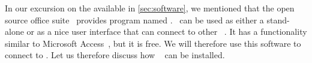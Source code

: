 %
%
\label{sec:installLibreOffice}%
%
In our excursion on the available  in \cref{sec:software}, we mentioned that the open source office suite \libreoffice\ provides program named \libreofficeBase.
\libreofficeBase\ can be used as either a stand-alone  or as a nice user interface that can connect to other ~\cite{FNFHWSKLSSGLFRSRPLJG2022BG7R1BOL7C,S2022L7PFEUU}.
It has a functionality similar to Microsoft Access~\cite{SSI2023MA2BTA,B2020HOMA2,UC2021AFD}, but it is free.
We will therefore use this software to connect to \postgresql.
Let us therefore discuss how \libreoffice~\cite{DF2024LTDF,GL2012LTSOOSSCBAFACSOL,S2022L7PFEUU} can be installed.%
%
%
%
%
\endhsection%
%
